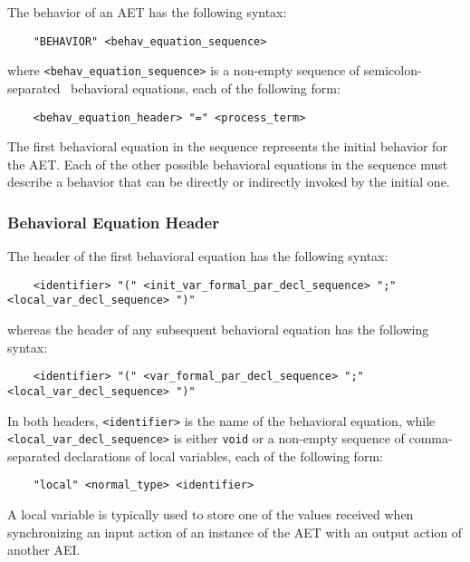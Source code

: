 The behavior of an AET has the following syntax:

	\begin{verbatim}
    "BEHAVIOR" <behav_equation_sequence>
	\end{verbatim}

\noindent where {\tt <behav\_equation\_sequence>} is a non-empty sequence of semicolon-separated \empagr\
behavioral equations, each of the following form:

	\begin{verbatim}
    <behav_equation_header> "=" <process_term>
	\end{verbatim}

\noindent The first behavioral equation in the sequence represents the initial behavior for the AET. Each of
the other possible behavioral equations in the sequence must describe a behavior that can be directly or
indirectly invoked by the initial one.


\subsubsection{Behavioral Equation Header}

The header of the first behavioral equation has the following syntax:

	\begin{verbatim}
    <identifier> "(" <init_var_formal_par_decl_sequence> ";" <local_var_decl_sequence> ")"
	\end{verbatim}

\noindent whereas the header of any subsequent behavioral equation has the following syntax:

	\begin{verbatim}
    <identifier> "(" <var_formal_par_decl_sequence> ";" <local_var_decl_sequence> ")"
	\end{verbatim}

\noindent In both headers, {\tt <identifier>} is the name of the behavioral equation, while
{\tt <local\_var\_decl\_sequence>} is either {\tt void} or a non-empty sequence of comma-separated
declarations of local variables, each of the following form:

	\begin{verbatim}
    "local" <normal_type> <identifier>
	\end{verbatim}

A local variable is typically used to store one of the values received when synchronizing an input action of
an instance of the AET with an output action of another AEI.

